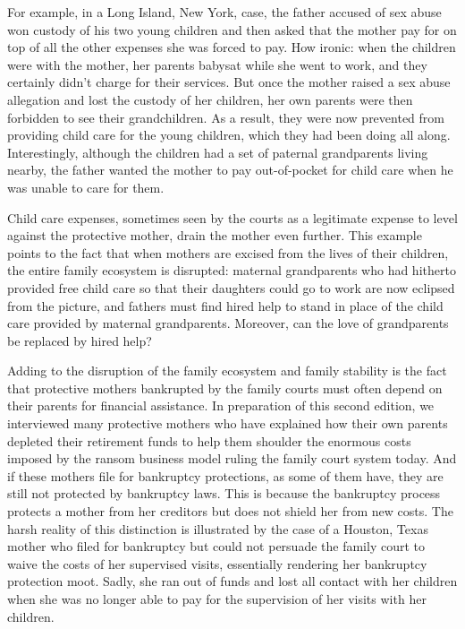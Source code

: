 For example, in a Long Island, New York, case, the father accused of
sex abuse won custody of his two young children and then asked that
the mother pay for  on top of all the other expenses
she was forced to pay. How ironic: when the children were with the
mother, her parents babysat while she went to work, and they certainly
didn't charge for their services. But once the mother raised a sex abuse
allegation and lost the custody of her children, her own parents were
then forbidden to see their grandchildren. As a result, they were now
prevented from providing  child care for the young children,
which they had been doing all along. Interestingly, although the children
had a set of paternal grandparents living nearby, the father wanted the
mother to pay out-of-pocket for child care when he was unable to care for
them. \pfl{}

\vspace{-1.1em}
Child care expenses, sometimes seen by the courts 
as a legitimate expense to level against the protective mother, drain the mother even
further. This example points to the fact that  when mothers are excised from
the lives of their children, the entire family ecosystem is disrupted:
maternal grandparents who had hitherto provided free child care so that
their daughters could go to work are now eclipsed from the picture, and
fathers must find hired help to stand in place of the child care provided
by maternal grandparents. Moreover, can the love of grandparents
be replaced by hired help? \pfl{}

Adding to the disruption of the family ecosystem and family stability
is the fact that protective mothers bankrupted by the family courts must
often depend on their parents for financial assistance. In preparation
of this second edition, we interviewed many protective mothers who
have explained how their own parents depleted their retirement funds
to help them shoulder the enormous costs imposed by the ransom 
business model ruling the family court system today. And if these mothers
file for bankruptcy protections, as some of them have, they are still not
protected by bankruptcy laws. This is because the bankruptcy process
protects a mother from her creditors but does not shield her from new
costs. The harsh reality of this distinction is illustrated by the case of a
Houston, Texas mother who filed for bankruptcy but could not persuade
the family court to waive the costs of her supervised visits, essentially
rendering her bankruptcy protection moot. Sadly, she ran out of funds
and lost all contact with her children when she was no longer able to pay
for the supervision of her visits with her children. \pfl{}

